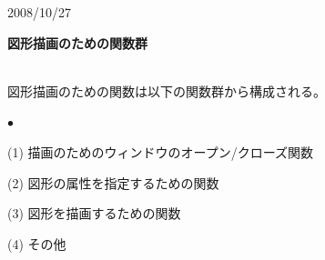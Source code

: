 \documentclass[11pt,a4j]{jarticle}
\newenvironment{itemize2}%
{%
   \begin{list}{$\bullet$\ \ }%
   {%
      \setlength{\itemindent}{0pt}
      \setlength{\leftmargin}{3zw}%
      \setlength{\rightmargin}{0zw}%
      \setlength{\labelsep}{0zw}%
      \setlength{\labelwidth}{3zw}%
      \setlength{\itemsep}{0em}%
      \setlength{\parsep}{0em}%
      \setlength{\listparindent}{0zw}%
   }
}{%
   \end{list}%
}
\begin{document}
\noindent
\begin{flushright}
{\small	2008/10/27}
\end{flushright}
\begin{center}
\begin{LARGE}
{\bf{図形描画のための関数群}}\\
\ \\
\end{LARGE}
\end{center}

  図形描画のための関数は以下の関数群から構成される。
\begin{itemize2}
  \item [(1)] 描画のためのウィンドウのオープン/クローズ関数 
  \item [(2)] 図形の属性を指定するための関数 
  \item [(3)] 図形を描画するための関数 
  \item [(4)] その他
\end{itemize2}
\end{document}
